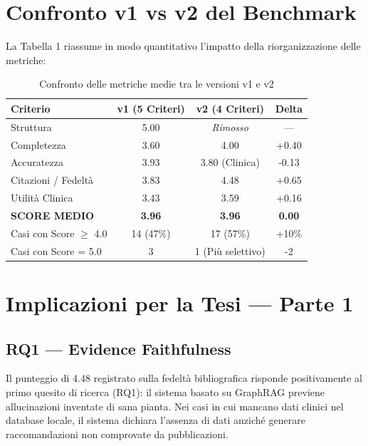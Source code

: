 \documentclass[12pt, a4paper]{article}
\begin{document}
\section{Confronto v1 vs v2 del Benchmark}

La Tabella 1 riassume in modo quantitativo l'impatto della riorganizzazione delle metriche:

\begin{table}[ht]
\centering\renewcommand{\arraystretch}{1.3}
\caption{Confronto delle metriche medie tra le versioni v1 e v2}
\begin{tabular}{lccc}
\toprule
\rowcolor{primaryblue}
\color{white}\textbf{Criterio} & \color{white}\textbf{v1 (5 Criteri)} & \color{white}\textbf{v2 (4 Criteri)} & \color{white}\textbf{Delta} \\
\midrule
Struttura & 5.00 & \cellcolor{lightgray}\textit{Rimosso} & --- \\
Completezza & 3.60 & 4.00 & +0.40 \\
Accuratezza & 3.93 & 3.80 (Clinica) & -0.13 \\
Citazioni / Fedeltà & 3.83 & 4.48 & +0.65 \\
Utilità Clinica & 3.43 & 3.59 & +0.16 \\
\midrule
\rowcolor{roweven}
\textbf{SCORE MEDIO} & \textbf{3.96} & \textbf{3.96} & \textbf{0.00} \\
\midrule
Casi con Score $\ge$ 4.0 & 14 (47\%) & 17 (57\%) & +10\% \\
Casi con Score = 5.0 & 3 & 1 (Più selettivo) & -2 \\
\bottomrule
\end{tabular}
\end{table}

\section{Implicazioni per la Tesi --- Parte 1}

\subsection{RQ1 --- Evidence Faithfulness}
Il punteggio di 4.48 registrato sulla fedeltà bibliografica risponde positivamente al primo quesito di ricerca (RQ1): il sistema basato su GraphRAG previene allucinazioni inventate di sana pianta. Nei casi in cui mancano dati clinici nel database locale, il sistema dichiara l'assenza di dati anziché generare raccomandazioni non comprovate da pubblicazioni.
\end{document}
